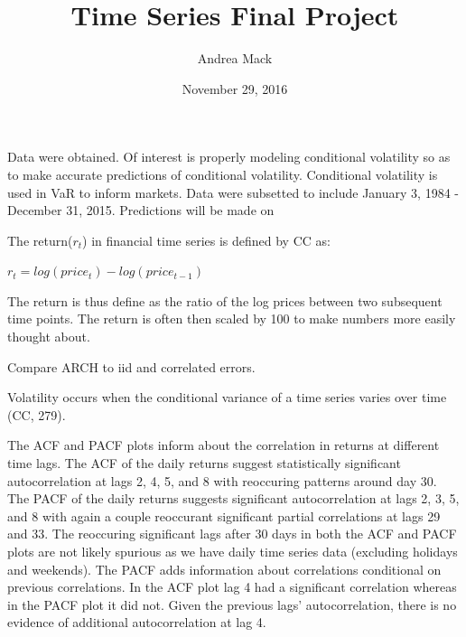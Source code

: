 \documentclass[11pt]{article}\usepackage[]{graphicx}\usepackage[]{color}
\title{Time Series Final Project}
\author{Andrea Mack}
\date{November 29, 2016}
\begin{document}
\maketitle

Data were obtained. Of interest is properly modeling conditional volatility so as to make accurate predictions of conditional volatility. Conditional volatility is used in VaR to inform markets. Data were subsetted to include January 3, 1984 - December 31, 2015. Predictions will be made on 

The return($r_{t}$) in financial time series is defined by CC as:

$r_{t} = log(price_{t}) - log(price_{t-1})$

The return is thus define as the ratio of the log prices between two subsequent time points. The return is often then scaled by 100 to make numbers more easily thought about. 

Compare ARCH to iid and correlated errors.




Volatility occurs when the conditional variance of a time series varies over time (CC, 279).



The ACF and PACF plots inform about the correlation in returns at different time lags. The ACF of the daily returns suggest statistically significant autocorrelation at lags 2, 4, 5, and 8 with reoccuring patterns around day 30. The PACF of the daily returns suggests significant autocorrelation at lags 2, 3, 5, and 8 with again a couple reoccurant significant partial correlations at lags 29 and 33. The reoccuring significant lags after 30 days in both the ACF and PACF plots are not likely spurious as we have daily time series data (excluding holidays and weekends). The PACF adds information about correlations conditional on previous correlations. In the ACF plot lag 4 had a significant correlation whereas in the PACF plot it did not. Given the previous lags' autocorrelation, there is no evidence of additional autocorrelation at lag 4.
\end{document}
